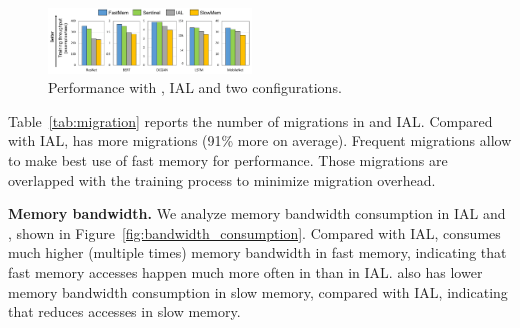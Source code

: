 \begin{figure}
    \centering
    \includegraphics[width=0.48\textwidth]{figures/sentinel_performance.pdf}
\vspace{-25pt}    
\caption{
\textcolor{check}{
Performance with \name, IAL and two configurations. %
}
\vspace{-15pt}
\label{fig:general_perf}}
\end{figure}

Table~\ref{tab:migration} reports the number of migrations in \name and IAL. Compared with IAL, \name has more migrations \textcolor{check}{(91\% more on average)}. Frequent migrations allow \name to make best use of fast memory for performance. \textcolor{check}{Those migrations are  overlapped with the training process to minimize migration overhead.}


\textcolor{check}{\textbf{Memory bandwidth.} 
We analyze memory bandwidth consumption in IAL and \name, shown in Figure~\ref{fig:bandwidth_consumption}. 
Compared with IAL, \name consumes much higher (multiple times) memory bandwidth in fast memory, indicating that fast memory accesses happen much more often in \name than in IAL. \name also has lower memory bandwidth consumption in slow memory, compared with IAL, indicating that \name reduces accesses in slow memory.} %

